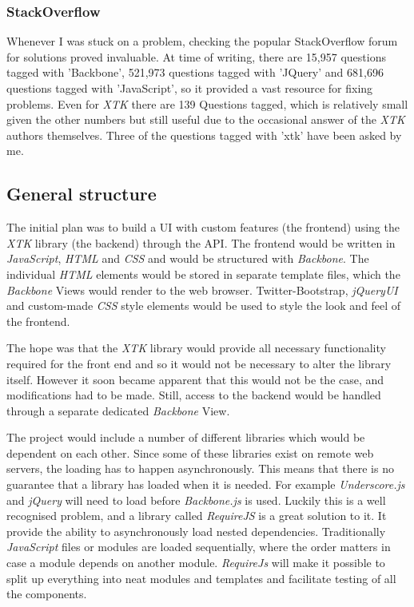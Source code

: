 \documentclass[a4paper,11pt,twoside]{article}
\begin{document}
\subsubsection{StackOverflow}

Whenever I was stuck on a problem, checking the popular StackOverflow forum for solutions proved invaluable. At time of writing, there are 15,957 questions tagged with 'Backbone', 521,973 questions tagged with 'JQuery' and 681,696 questions tagged with 'JavaScript', so it provided a vast resource for fixing problems. Even for \textit{XTK} there are 139 Questions tagged, which is relatively small given the other numbers but still useful due to the occasional answer of the \textit{XTK} authors themselves. Three of the questions tagged with 'xtk' have been asked by me.



\subsection{General structure}

The initial plan was to build a UI with custom features (the frontend) using the \textit{XTK} library (the backend) through the API. The frontend would be written in \textit{JavaScript}, \textit{HTML} and \textit{CSS} and would be structured with \textit{Backbone}. The individual \textit{HTML} elements would be stored in separate template files, which the \textit{Backbone} Views would render to the web browser. Twitter-Bootstrap, \textit{jQueryUI} and custom-made \textit{CSS} style elements would be used to style the look and feel of the frontend.

The hope was that the \textit{XTK} library would provide all necessary functionality required for the front end and so it would not be necessary to alter the library itself. However it soon became apparent that this would not be the case, and modifications had to be made. Still, access to the backend would be handled through a separate dedicated \textit{Backbone} View. 

The project would include a number of different libraries which would be dependent on each other. Since some of these libraries exist on remote web servers, the loading has to happen asynchronously. This means that there is no guarantee that a library has loaded when it is needed. For example \textit{Underscore.js} and \textit{jQuery} will need to load before \textit{Backbone.js} is used. Luckily this is a well recognised problem, and a library called \textit{RequireJS} is a great solution to it. It provide the ability to asynchronously load nested dependencies. Traditionally \textit{JavaScript} files or modules are loaded sequentially, where the order matters in case a module depends on another module. \textit{RequireJs} will make it possible to split up everything into neat modules and templates and facilitate testing of all the components.
\end{document}
